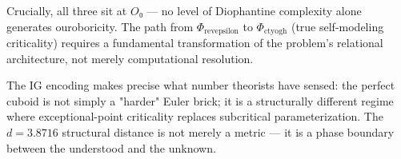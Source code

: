 \documentclass[10pt,a4paper]{article}
\begin{document}
Crucially, all three sit at $O₀$ --- no level of Diophantine complexity alone generates ouroboricity. The path from $\Phi_{\text{revepsilon}}$ to $\Phi_{\text{ctyogh}}$ (true self-modeling criticality) requires a fundamental transformation of the problem's relational architecture, not merely computational resolution.

The IG encoding makes precise what number theorists have sensed: the perfect cuboid is not simply a "harder" Euler brick; it is a structurally different regime where exceptional-point criticality replaces subcritical parameterization. The $d = 3.8716$ structural distance is not merely a metric --- it is a phase boundary between the understood and the unknown.
\end{document}
